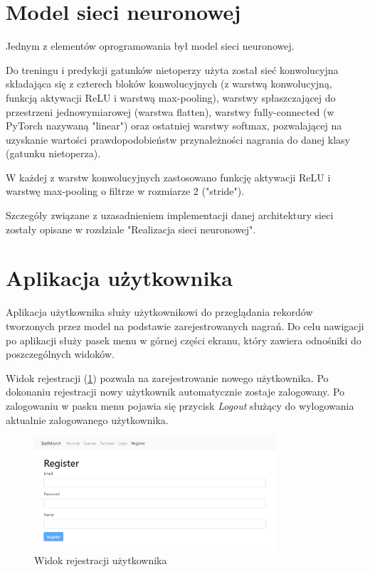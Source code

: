 \documentclass{sprz}
\begin{document}
\section{Model sieci neuronowej}
Jednym z elementów oprogramowania był model sieci neuronowej. 

Do treningu i predykcji gatunków nietoperzy użyta został sieć konwolucyjna składająca się z czterech bloków konwolucyjnych (z warstwą konwolucyjną, funkcją aktywacji ReLU i warstwą max-pooling), warstwy spłaszczającej do przestrzeni jednowymiarowej (warstwa flatten), warstwy fully-connected (w PyTorch nazywaną "linear") oraz ostatniej warstwy softmax, pozwalającej na uzyskanie wartości prawdopodobieństw przynależności nagrania do danej klasy (gatunku nietoperza).

W każdej z warstw konwolucyjnych zastosowano funkcję aktywacji ReLU i warstwę max-pooling o filtrze w rozmiarze 2 ("stride").

Szczegóły związane z uzasadnieniem implementacji danej architektury sieci zostały opisane w rozdziale "Realizacja sieci neuronowej".
\clearpage

\section{Aplikacja użytkownika}

Aplikacja użytkownika służy użytkownikowi do przeglądania rekordów tworzonych przez model na podstawie zarejestrowanych nagrań. Do celu nawigacji po aplikacji służy pasek menu w górnej części ekranu, który zawiera odnośniki do poszczególnych widoków.

Widok rejestracji (\ref{img:app_register}) pozwala na zarejestrowanie nowego użytkownika. Po dokonaniu rejestracji nowy użytkownik automatycznie zostaje zalogowany. Po zalogowaniu w pasku menu pojawia się przycisk \textit{Logout} służący do wylogowania aktualnie zalogowanego użytkownika.
\begin{figure}[h]
  \centering
  \includegraphics[width=0.8\textwidth]{sprz/app_register}
  \caption{Widok rejestracji użytkownika}
  \label{img:app_register}
\end{figure}
\end{document}
